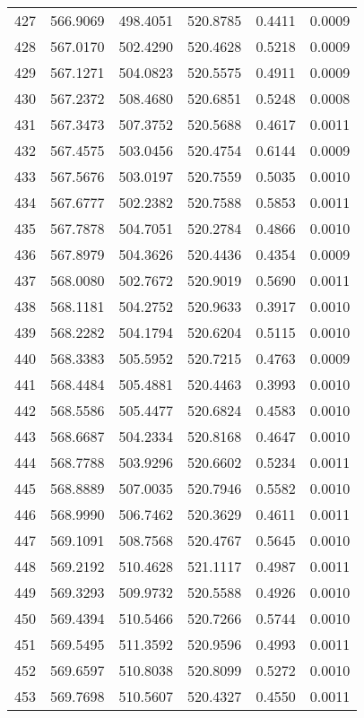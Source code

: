 \documentclass{article}
\begin{document}
\begin{longtable}{|c|c|c|c|c|c|}
427 & 566.9069 & 498.4051 & 520.8785 & 0.4411 & 0.0009 \\
428 & 567.0170 & 502.4290 & 520.4628 & 0.5218 & 0.0009 \\
429 & 567.1271 & 504.0823 & 520.5575 & 0.4911 & 0.0009 \\
430 & 567.2372 & 508.4680 & 520.6851 & 0.5248 & 0.0008 \\
431 & 567.3473 & 507.3752 & 520.5688 & 0.4617 & 0.0011 \\
432 & 567.4575 & 503.0456 & 520.4754 & 0.6144 & 0.0009 \\
433 & 567.5676 & 503.0197 & 520.7559 & 0.5035 & 0.0010 \\
434 & 567.6777 & 502.2382 & 520.7588 & 0.5853 & 0.0011 \\
435 & 567.7878 & 504.7051 & 520.2784 & 0.4866 & 0.0010 \\
436 & 567.8979 & 504.3626 & 520.4436 & 0.4354 & 0.0009 \\
437 & 568.0080 & 502.7672 & 520.9019 & 0.5690 & 0.0011 \\
438 & 568.1181 & 504.2752 & 520.9633 & 0.3917 & 0.0010 \\
439 & 568.2282 & 504.1794 & 520.6204 & 0.5115 & 0.0010 \\
440 & 568.3383 & 505.5952 & 520.7215 & 0.4763 & 0.0009 \\
441 & 568.4484 & 505.4881 & 520.4463 & 0.3993 & 0.0010 \\
442 & 568.5586 & 505.4477 & 520.6824 & 0.4583 & 0.0010 \\
443 & 568.6687 & 504.2334 & 520.8168 & 0.4647 & 0.0010 \\
444 & 568.7788 & 503.9296 & 520.6602 & 0.5234 & 0.0011 \\
445 & 568.8889 & 507.0035 & 520.7946 & 0.5582 & 0.0010 \\
446 & 568.9990 & 506.7462 & 520.3629 & 0.4611 & 0.0011 \\
447 & 569.1091 & 508.7568 & 520.4767 & 0.5645 & 0.0010 \\
448 & 569.2192 & 510.4628 & 521.1117 & 0.4987 & 0.0011 \\
449 & 569.3293 & 509.9732 & 520.5588 & 0.4926 & 0.0010 \\
450 & 569.4394 & 510.5466 & 520.7266 & 0.5744 & 0.0010 \\
451 & 569.5495 & 511.3592 & 520.9596 & 0.4993 & 0.0011 \\
452 & 569.6597 & 510.8038 & 520.8099 & 0.5272 & 0.0010 \\
453 & 569.7698 & 510.5607 & 520.4327 & 0.4550 & 0.0011 \\

\end{longtable}
\end{document}
